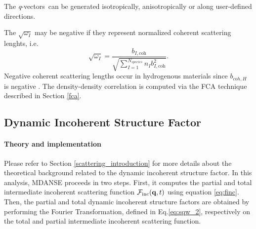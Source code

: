 \documentclass[a4paper,11pt]{article}
\newcommand{\qvects}{\textit{q}-vectors}
\begin{document}
The \qvects\ can be generated isotropically, anisotropically or along user-defined directions.

The $\sqrt{\omega_I}$ may be negative if they represent normalized coherent scattering lenghts, i.e.
\begin{equation}
\sqrt{\omega_I} = \frac{b_{I,\mathrm{coh}}}{\sqrt{\sum_{I = 1}^{N_{species}} n_I b^2_{I,\mathrm{coh}}}}.
\end{equation}
Negative coherent scattering lengths occur in hydrogenous materials since $b_{coh,H}$ is negative \cite{Lovesey}.
The density-density correlation is computed via the \gls{FCA} technique described in Section \ref{fca}.


\subsection{Dynamic Incoherent Structure Factor}
\label{disf}
\paragraph{Theory and implementation\\}
\label{disf_theory}
Please refer to Section \ref{scattering_introduction} for more details about the theoretical background related to the dynamic 
incoherent structure factor. In this analysis, \gls{MDANSE} proceeds in two steps. First, it computes the partial and total 
intermediate incoherent scattering function ${\cal F}_{\mathrm{inc}}({\bf q},t)$ using equation \ref{eq:finc}. Then, the partial 
and total dynamic incoherent structure factors are obtained by performing the Fourier Transformation, defined 
in Eq.\ref{eq:sqw_2}, respectively on the total and partial intermediate incoherent scattering function.
\end{document}
